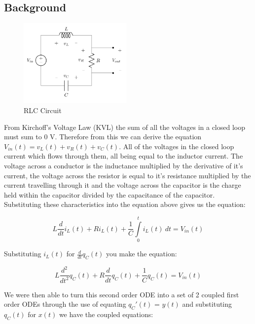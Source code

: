 \documentclass[11pt,a4paper]{article}
\begin{document}
\subsection{Background}

\begin{figure}
\vspace{-10mm}
  		\includegraphics[width=0.49\textwidth]{Ex3_Figs/RLC.png}
\vspace{-6mm}
  	\caption{RLC Circuit}
  	\label{fig:RLC}
\end{figure}


From Kirchoff's Voltage Law (KVL) the sum of all the voltages in a closed loop must sum to 0 V. Therefore from this we can derive the equation $V_{in}(t) = v_L(t)+v_R(t)+v_C(t)$. All of the voltages in the closed loop current which flows through them, all being equal to the inductor current. The voltage across a conductor is the inductance multiplied by the derivative of it's current, the voltage across the resistor is equal to it's resistance multiplied by the current travelling through it and the voltage across the capacitor is the charge held within the capacitor divided by the capacitance of the capacitor. Substituting these characteristics into the equation above gives us the equation:

\begin{equation}
	L \frac{d}{dt}i_L(t) + R i_L(t) + \frac{1}{C}\int\limits_0^t i_L(t) \ dt = V_{in}(t)
\end{equation}

Substituting $i_L(t)$ for $\frac{d}{dt}q_C(t)$ you make the equation:

\begin{equation}
	L \frac{d^2}{dt^2}q_C(t) + R\frac{d}{dt}q_C(t) + \frac{1}{C}q_C(t) = V_{in}(t)
\end{equation}

We were then able to turn this second order ODE into a set of 2 coupled first order ODEs through the use of equating $q_C'(t)$ = $y(t)$ and substituting $q_C(t)$ for $x(t)$ we have the coupled equations:
\end{document}
